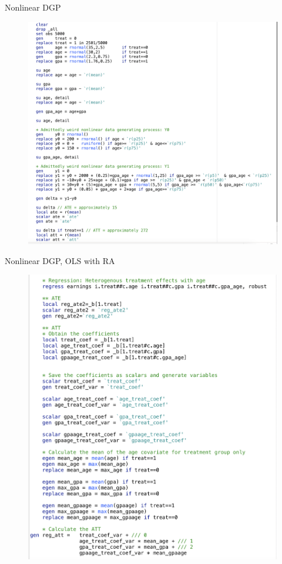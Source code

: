 \documentclass{beamer}
\begin{document}
\begin{frame}{Nonlinear DGP}

\begin{figure}[!t]\centering
\includegraphics[scale=0.21]{./lecture_includes/nonlinear_code}
\end{figure}

\end{frame}

\begin{frame}{Nonlinear DGP, OLS with RA}

\begin{figure}[!t]\centering
\includegraphics[scale=0.21]{./lecture_includes/nonlinear_ra}
\end{figure}

\end{frame}
\end{document}
